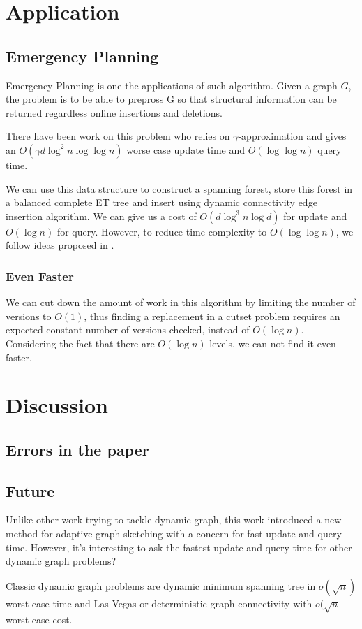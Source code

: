 \documentclass[conference,compsoc]{IEEEtran}
\begin{document}
\section{Application}
	\subsection{Emergency Planning}
		\par Emergency Planning is one the applications of such algorithm. Given a graph $G$, the problem is to be able to prepross G so that structural information can be returned regardless online insertions and deletions.
		\par There have been work on this problem\cite{abboud2014popular} who relies on $\gamma$-approximation and gives an $O(\gamma d \log^2n\log\log n)$ worse case update time and $O(\log \log n)$ query time.
		\par We can use this data structure to construct a spanning forest, store this forest in a balanced complete ET tree and insert using dynamic connectivity edge insertion algorithm. 
		We can give us a cost of $O(d\log^3 n \log d)$ for update and $O(\log n)$ for query.
		However, to reduce time complexity to $O(\log \log n)$, we follow ideas proposed in \cite{abboud2014popular}. 
	\subsubsection{Even Faster}
		\par We can cut down the amount of work in this algorithm by limiting the number of versions to $O(1)$, thus finding a replacement in a cutset problem requires an expected constant number of versions checked, instead of $O(\log n)$. Considering the fact that there are $O(\log n)$ levels, we can not find it even faster.
\section{Discussion}
	\subsection{Errors in the paper}
	\subsection{Future}
		\par Unlike other work trying to tackle dynamic graph, this work introduced a new method for adaptive graph sketching with a concern for fast update and query time. 
		However, it's interesting to ask the fastest update and query time for other dynamic graph problems?
		\par Classic dynamic graph problems are dynamic minimum spanning tree in $o(\sqrt{n})$ worst case time and Las Vegas or deterministic graph connectivity with $o(\sqrt{n}$ worst case cost.



\end{document}

